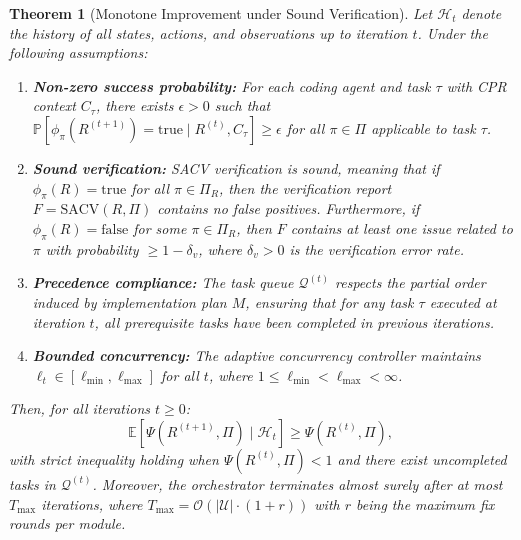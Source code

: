 \documentclass{ieeeaccess}
\newtheorem{theorem}{Theorem}
\begin{document}
\begin{theorem}[Monotone Improvement under Sound Verification]
\label{thm:convergence}
Let \(\mathcal{H}_t\) denote the history of all states, actions, and observations up to iteration \(t\). Under the following assumptions:
\begin{enumerate}
\item \textbf{Non-zero success probability:} For each coding agent and task \(\tau\) with CPR context \(C_\tau\), there exists \(\epsilon > 0\) such that \(\mathbb{P}[\phi_{\pi}(R^{(t+1)}) = \text{true} \mid R^{(t)}, C_\tau] \geq \epsilon\) for all \(\pi \in \Pi\) applicable to task \(\tau\).
\item \textbf{Sound verification:} SACV verification is sound, meaning that if \(\phi_{\pi}(R) = \text{true}\) for all \(\pi \in \Pi_R\), then the verification report \(F = \text{SACV}(R, \Pi)\) contains no false positives. Furthermore, if \(\phi_{\pi}(R) = \text{false}\) for some \(\pi \in \Pi_R\), then \(F\) contains at least one issue related to \(\pi\) with probability \(\geq 1 - \delta_v\), where \(\delta_v > 0\) is the verification error rate.
\item \textbf{Precedence compliance:} The task queue \(\mathcal{Q}^{(t)}\) respects the partial order induced by implementation plan \(M\), ensuring that for any task \(\tau\) executed at iteration \(t\), all prerequisite tasks have been completed in previous iterations.
\item \textbf{Bounded concurrency:} The adaptive concurrency controller maintains \(\ell_t \in [\ell_{\min}, \ell_{\max}]\) for all \(t\), where \(1 \leq \ell_{\min} < \ell_{\max} < \infty\).
\end{enumerate}
Then, for all iterations \(t \geq 0\):
\begin{equation}
\mathbb{E}[\Psi(R^{(t+1)}, \Pi) \mid \mathcal{H}_t] \geq \Psi(R^{(t)}, \Pi),
\label{eq:monotone}
\end{equation}
with strict inequality holding when \(\Psi(R^{(t)}, \Pi) < 1\) and there exist uncompleted tasks in \(\mathcal{Q}^{(t)}\). Moreover, the orchestrator terminates almost surely after at most \(T_{\max}\) iterations, where \(T_{\max} = \mathcal{O}(|\mathcal{U}| \cdot (1 + r))\) with \(r\) being the maximum fix rounds per module.
\end{theorem}
\end{document}
